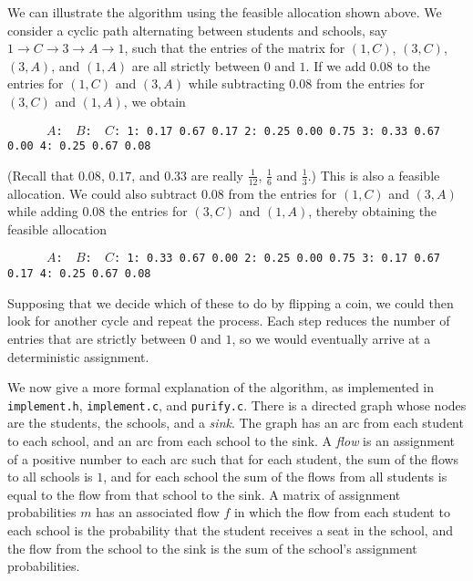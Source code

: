 \documentclass[12pt]{article}
\theoremstyle{definition}
\begin{document}
We can illustrate the algorithm using the feasible allocation shown
above.  We consider a cyclic path alternating between students and
schools, say $1 \to C \to 3 \to A \to 1$, such that the entries of the
matrix for $(1,C)$, $(3,C)$, $(3,A)$, and $(1,A)$ are all strictly
between $0$ and $1$.  If we add $0.08$ to the entries for $(1,C)$ and
$(3,A)$ while subtracting $0.08$ from the entries for $(3,C)$ and
$(1,A)$, we obtain
\begin{obeylines}\texttt{
\ \ \ \ \ $A$:    \     $B$:  \  $C$:
1:      0.17     0.67     0.17
2:      0.25     0.00     0.75
3:      0.33     0.67     0.00
4:      0.25     0.67     0.08
}
\end{obeylines} \noindent
(Recall that $0.08$, $0.17$, and $0.33$ are really $\tfrac{1}{12}$,
$\tfrac16$ and $\tfrac13$.)  This is also a feasible allocation.  We
could also subtract $0.08$ from the entries for $(1,C)$ and $(3,A)$
while adding $0.08$ the entries for $(3,C)$ and $(1,A)$, thereby
obtaining the feasible allocation
\begin{obeylines}\texttt{
\ \ \ \ \ $A$:    \     $B$:  \      $C$:
1:      0.33     0.67     0.00
2:      0.25     0.00     0.75
3:      0.17     0.67     0.17
4:      0.25     0.67     0.08
}
\end{obeylines} \noindent
Supposing that we decide which of these to do by flipping a coin, we
could then look for another cycle and repeat the process.  Each step
reduces the number of entries that are strictly between $0$ and $1$,
so we would eventually arrive at a deterministic assignment.

We now give a more formal explanation of the algorithm, as implemented
in \texttt{implement.h}, \texttt{implement.c}, and \texttt{purify.c}.
There is a directed graph whose nodes are the students, the schools,
and a \emph{sink}.  The graph has an arc from each student to each
school, and an arc from each school to the sink.  A \emph{flow} is an
assignment of a positive number to each arc such that for each
student, the sum of the flows to all schools is $1$, and for each
school the sum of the flows from all students is equal to the flow
from that school to the sink.  A matrix of assignment probabilities
$m$ has an associated flow $f$ in which the flow from each student to
each school is the probability that the student receives a seat in the
school, and the flow from the school to the sink is the sum of the
school's assignment probabilities.
\end{document}
